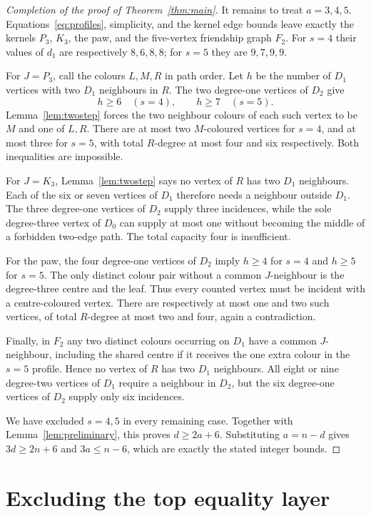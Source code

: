\documentclass[11pt]{article}
\begin{document}
\begin{proof}[Completion of the proof of Theorem~\ref{thm:main}]
It remains to treat $a=3,4,5$.  Equations~\eqref{eq:profiles}, simplicity,
and the kernel edge bounds leave exactly the kernels $P_3$, $K_3$, the paw,
and the five-vertex friendship graph $F_2$.  For $s=4$ their values of
$d_1$ are respectively $8,6,8,8$; for $s=5$ they are $9,7,9,9$.

For $J=P_3$, call the colours $L,M,R$ in path order.  Let $h$ be the number
of $D_1$ vertices with two $D_1$ neighbours in $R$.  The two degree-one
vertices of $D_2$ give
\[
 h\ge6\quad(s=4),\qquad h\ge7\quad(s=5).
\]
Lemma~\ref{lem:twostep} forces the two neighbour colours of each such vertex
to be $M$ and one of $L,R$.  There are at most two $M$-coloured vertices for
$s=4$, and at most three for $s=5$, with total $R$-degree at most four and
six respectively.  Both inequalities are impossible.

For $J=K_3$, Lemma~\ref{lem:twostep} says no vertex of $R$ has two
$D_1$ neighbours.  Each of the six or seven vertices of $D_1$ therefore
needs a neighbour outside $D_1$.  The three degree-one vertices of $D_2$
supply three incidences, while the sole degree-three vertex of $D_0$ can
supply at most one without becoming the middle of a forbidden two-edge
path.  The total capacity four is insufficient.

For the paw, the four degree-one vertices of $D_2$ imply
$h\ge4$ for $s=4$ and $h\ge5$ for $s=5$.  The only distinct colour pair
without a common $J$-neighbour is the degree-three centre and the leaf.
Thus every counted vertex must be incident with a centre-coloured vertex.
There are respectively at most one and two such vertices, of total
$R$-degree at most two and four, again a contradiction.

Finally, in $F_2$ any two distinct colours occurring on $D_1$ have a common
$J$-neighbour, including the shared centre if it receives the one extra
colour in the $s=5$ profile.  Hence no vertex of $R$ has two $D_1$
neighbours.  All eight or nine degree-two vertices of $D_1$ require a
neighbour in $D_2$, but the six degree-one vertices of $D_2$ supply only six
incidences.

We have excluded $s=4,5$ in every remaining case.  Together with
Lemma~\ref{lem:preliminary}, this proves $d\ge2a+6$.  Substituting
$a=n-d$ gives $3d\ge2n+6$ and $3a\le n-6$, which are exactly the stated
integer bounds.
\end{proof}

\section{Excluding the top equality layer}
\end{document}
